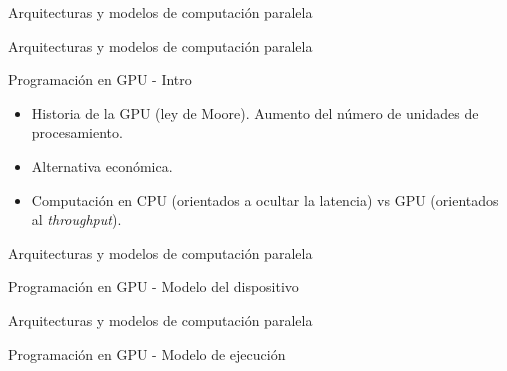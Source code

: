 \begin{frame}
\vfill
\begin{center}
\begin{block}{\begin{center}\begin{Huge}Arquitecturas y modelos de computación paralela\end{Huge}\end{center}}
\end{block}
\end{center}
\end{frame}

\begin{frame}{Arquitecturas y modelos de computación paralela}
\begin{block}{Programación en GPU - Intro}
\begin{itemize}
  \item Historia de la GPU (ley de Moore). Aumento del número de unidades de procesamiento.
  \item Alternativa económica.
  \item Computación en CPU (orientados a ocultar la latencia) vs GPU (orientados al \textit{throughput}).
\end{itemize}
\centerline{}
\end{block}
\end{frame}

\begin{frame}{Arquitecturas y modelos de computación paralela}
\begin{block}{Programación en GPU - Modelo del dispositivo}
\centerline{}
\end{block}
\end{frame}

\begin{frame}{Arquitecturas y modelos de computación paralela}
\begin{block}{Programación en GPU - Modelo de ejecución}
\begin{columns}

  \begin{column}{.50\textwidth}
	\centerline{
      }
  \end{column}
  
  \begin{column}{.50\textwidth}
    \centerline{
      }
  \end{column}
  
\end{columns}
\end{block}
\end{frame}

